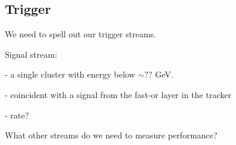 
\subsection{Trigger}

We need to spell out our trigger streams. 

Signal stream: 

- a single cluster with energy below $\sim ??$ GeV. 

- coincident with a signal from the fast-or layer in the tracker

- rate? 

What other streams do we need to measure performance? 
